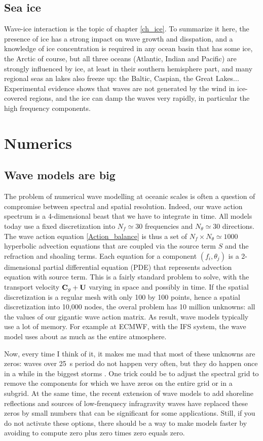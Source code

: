 \subsection{Sea ice}
Wave-ice interaction is the topic of chapter \ref{ch_ice}. To summarize it here, the presence of ice has a strong impact on wave growth and disspation, and a knowledge of ice concentration  
is required in any ocean basin that has some ice, the Arctic of course, but all three oceans (Atlantic, Indian and Pacific) are strongly influenced by ice, at least 
in their southern hemisphere part, and many regional seas an lakes also freeze up: the Baltic, Caspian, the Great Lakes...  Experimental evidence shows 
that waves are not generated by the wind in ice-covered regions, and the ice can damp the waves very rapidly, in particular the high frequency components.

\section{Numerics}
\subsection{Wave models are big}
The problem of numerical wave modelling at oceanic scales is often a question of compromise between spectral and spatial resolution. Indeed, our wave action spectrum 
is a 4-dimensional beast that we have to integrate in time. All models today use a fixed discretization into $N_f \simeq 30$ frequencies and $N_\theta \simeq 30$ directions. 
The wave action equation \ref{Action_balance} is thus a set of $N_f \times N_\theta \simeq 1000$ hyperbolic advection equations that are coupled via the source term $S$ and the 
refraction and shoaling terms. Each equation for a component $(f_i,\theta_j)$ is a 2-dimensional partial differential equation (PDE) that represents advection equation with source term.  This is a fairly standard problem to 
solve, with the transport velocity $\mathbf{C}_g + \mathbf{U}$ varying in space and possibly in time. If the spatial discretization is a regular mesh with only  100 by 100 points, 
hence a spatial discretization into 10,000 nodes, the overal problem has 10 million unknowns: all the values of our gigantic wave action matrix. As result, wave models typically 
use a lot of memory. For example at ECMWF, with the IFS system, the wave model uses about as much as the entire atmosphere. 

Now, every time I think of it, it makes me mad that most of these unknowns are zeros: waves over 25~s period do not happen very often, but they do happen once in a while in the 
biggest storms \citep{Hanafin&al.2012}. One trick could be to adjust the spectral grid to remove the components for which we have zeros on the entire grid or in a subgrid. 
At the same time, the recent extension of wave models to add shoreline reflections \citep{Ardhuin&Roland2012} and sources of low-frenquecy infragravity waves  \citep{Ardhuin&al.2014} have 
replaced these zeros by small numbers that can be significant for some applications.
Still, if you do not activate these options, there should be a way to make models faster by avoiding to compute zero plus zero times zero equals zero.

